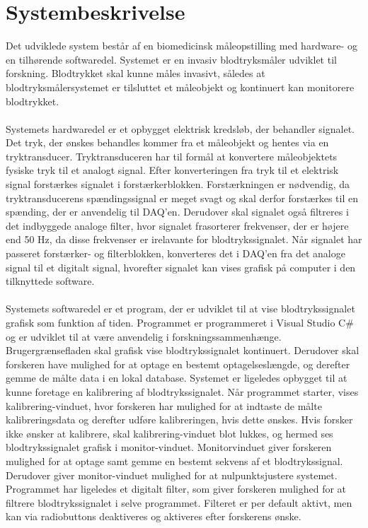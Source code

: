 \chapter{Systembeskrivelse}
Det udviklede system består af en biomedicinsk måleopstilling med hardware- og en tilhørende softwaredel. Systemet er en invasiv blodtryksmåler udviklet til forskning. Blodtrykket skal kunne måles invasivt, således at blodtryksmålersystemet er tilsluttet et måleobjekt og kontinuert kan monitorere blodtrykket. \\\\
Systemets hardwaredel er et opbygget elektrisk kredsløb, der behandler signalet. Det tryk, der ønskes behandles kommer fra et måleobjekt og hentes via en tryktransducer. Tryktransduceren har til formål at konvertere måleobjektets fysiske tryk til et analogt signal. Efter konverteringen fra tryk til et elektrisk signal forstærkes signalet i forstærkerblokken. Forstærkningen er nødvendig, da tryktransducerens spændingssignal er meget svagt og skal derfor forstærkes til en spænding, der er anvendelig til DAQ’en. Derudover skal signalet også filtreres i det indbyggede analoge filter, hvor signalet frasorterer frekvenser, der er højere end 50 Hz, da disse frekvenser er irelavante for blodtrykssignalet. Når signalet har passeret forstærker- og filterblokken, konverteres det i DAQ’en fra det analoge signal til et digitalt signal, hvorefter signalet kan vises grafisk på computer i den tilknyttede software. \\\\
Systemets softwaredel er et program, der er udviklet til at vise blodtrykssignalet grafisk som funktion af tiden. Programmet er programmeret i Visual Studio C\# og er udviklet til at være anvendelig i forskningssammenhænge. Brugergrænsefladen skal grafisk vise blodtrykssignalet kontinuert. Derudover skal forskeren have mulighed for at optage en bestemt optagelseslængde, og derefter gemme de målte data i en lokal database. Systemet er ligeledes opbygget til at kunne foretage en kalibrering af blodtrykssignalet. Når programmet starter, vises kalibrering-vinduet, hvor forskeren har mulighed for at indtaste de målte kalibreringsdata og derefter udføre kalibreringen, hvis dette ønskes. Hvis forsker ikke ønsker at kalibrere, skal kalibrering-vinduet blot lukkes, og hermed ses blodtrykssignalet grafisk i monitor-vinduet. Monitorvinduet giver forskeren mulighed for at optage samt gemme en bestemt sekvens af et blodtrykssignal. Derudover giver monitor-vinduet mulighed for at nulpunktsjustere systemet. Programmet har ligeledes et digitalt filter, som giver forskeren mulighed for at filtrere blodtrykssignalet i selve programmet. Filteret er per default aktivt, men kan via radiobuttons deaktiveres og aktiveres efter forskerens ønske. 